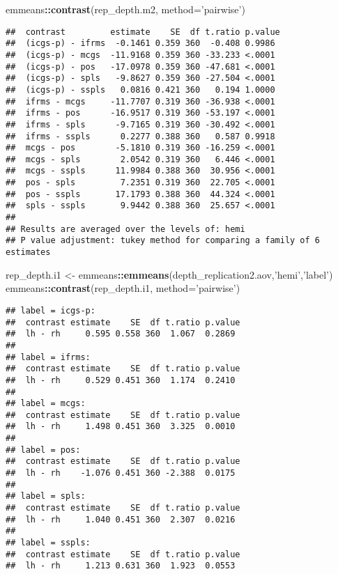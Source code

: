 \documentclass[
]{article}
\newenvironment{Shaded}{\begin{snugshade}}{\end{snugshade}}
\newcommand{\DataTypeTok}[1]{\textcolor[rgb]{0.13,0.29,0.53}{#1}}
\newcommand{\KeywordTok}[1]{\textcolor[rgb]{0.13,0.29,0.53}{\textbf{#1}}}
\newcommand{\NormalTok}[1]{#1}
\newcommand{\OperatorTok}[1]{\textcolor[rgb]{0.81,0.36,0.00}{\textbf{#1}}}
\newcommand{\StringTok}[1]{\textcolor[rgb]{0.31,0.60,0.02}{#1}}
\begin{document}
\begin{Shaded}
\begin{Highlighting}[]
\NormalTok{emmeans}\OperatorTok{::}\KeywordTok{contrast}\NormalTok{(rep_depth.m2, }\DataTypeTok{method=}\StringTok{'pairwise'}\NormalTok{)}
\end{Highlighting}
\end{Shaded}

\begin{verbatim}
##  contrast         estimate    SE  df t.ratio p.value
##  (icgs-p) - ifrms  -0.1461 0.359 360  -0.408 0.9986 
##  (icgs-p) - mcgs  -11.9168 0.359 360 -33.233 <.0001 
##  (icgs-p) - pos   -17.0978 0.359 360 -47.681 <.0001 
##  (icgs-p) - spls   -9.8627 0.359 360 -27.504 <.0001 
##  (icgs-p) - sspls   0.0816 0.421 360   0.194 1.0000 
##  ifrms - mcgs     -11.7707 0.319 360 -36.938 <.0001 
##  ifrms - pos      -16.9517 0.319 360 -53.197 <.0001 
##  ifrms - spls      -9.7165 0.319 360 -30.492 <.0001 
##  ifrms - sspls      0.2277 0.388 360   0.587 0.9918 
##  mcgs - pos        -5.1810 0.319 360 -16.259 <.0001 
##  mcgs - spls        2.0542 0.319 360   6.446 <.0001 
##  mcgs - sspls      11.9984 0.388 360  30.956 <.0001 
##  pos - spls         7.2351 0.319 360  22.705 <.0001 
##  pos - sspls       17.1793 0.388 360  44.324 <.0001 
##  spls - sspls       9.9442 0.388 360  25.657 <.0001 
## 
## Results are averaged over the levels of: hemi 
## P value adjustment: tukey method for comparing a family of 6 estimates
\end{verbatim}

\begin{Shaded}
\begin{Highlighting}[]
\NormalTok{rep_depth.i1 <-}\StringTok{ }\NormalTok{emmeans}\OperatorTok{::}\KeywordTok{emmeans}\NormalTok{(depth_replication2.aov,}\StringTok{'hemi'}\NormalTok{,}\StringTok{'label'}\NormalTok{)}
\NormalTok{emmeans}\OperatorTok{::}\KeywordTok{contrast}\NormalTok{(rep_depth.i1, }\DataTypeTok{method=}\StringTok{'pairwise'}\NormalTok{)}
\end{Highlighting}
\end{Shaded}

\begin{verbatim}
## label = icgs-p:
##  contrast estimate    SE  df t.ratio p.value
##  lh - rh     0.595 0.558 360  1.067  0.2869 
## 
## label = ifrms:
##  contrast estimate    SE  df t.ratio p.value
##  lh - rh     0.529 0.451 360  1.174  0.2410 
## 
## label = mcgs:
##  contrast estimate    SE  df t.ratio p.value
##  lh - rh     1.498 0.451 360  3.325  0.0010 
## 
## label = pos:
##  contrast estimate    SE  df t.ratio p.value
##  lh - rh    -1.076 0.451 360 -2.388  0.0175 
## 
## label = spls:
##  contrast estimate    SE  df t.ratio p.value
##  lh - rh     1.040 0.451 360  2.307  0.0216 
## 
## label = sspls:
##  contrast estimate    SE  df t.ratio p.value
##  lh - rh     1.213 0.631 360  1.923  0.0553
\end{verbatim}
\end{document}
